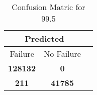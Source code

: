 \begin{table}[] 
\caption{Confusion Matric for 99.5} 
\label{Table: Prediction Accuracy-DMD99.5OnlySunEKF-resetReflectionperfectNoFailurePrediction-Reflection} 
\centering 
\begin{tabular} 
 {@{}ccc@{}} 
\toprule 
\multicolumn{2}{c}{\textbf{Predicted}}
 \\ \midrule 
\multicolumn{1}{|c|}{Failure} & 
\multicolumn{1}{c|}{No Failure}
 \\ \midrule 
\multicolumn{1}{|c|}{\color{green}\textbf{128132}} & 
\multicolumn{1}{c|}{\color{red}\textbf{0}}
 \\ \midrule 
\multicolumn{1}{|c|}{\color{red}\textbf{211}} & 
\multicolumn{1}{c|}{\color{green}\textbf{41785}}
 \\ \bottomrule 
\end{tabular} 
\end{table} 
